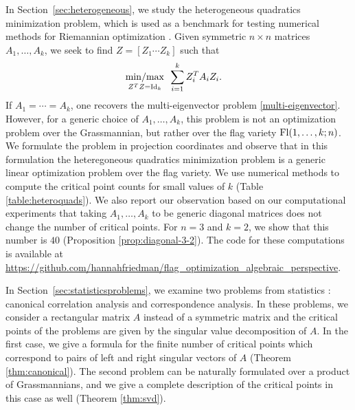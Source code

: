\documentclass[12pt]{extarticle}
\theoremstyle{definition}
\numberwithin{theorem}{section}
\newcommand{\minmax}{\mathop{{\rm min/max}}}
\begin{document}
In Section~\ref{sec:heterogeneous}, we study the heterogeneous quadratics minimization problem, which is used as a benchmark for testing numerical methods for Riemannian optimization \cite{oviedo2022}. 
Given symmetric $n \times n$ matrices $A_1, \ldots, A_k$, we seek to find $Z=[Z_1 \cdots Z_k]$ such that
\begin{align} \label{heteroquads}
    \minmax_{Z^TZ = {\rm Id}_k}
    & \,\,\, \sum_{i=1}^k Z_i^T A_i Z_i.
\end{align}
If $A_1 = \cdots = A_k$, one recovers the multi-eigenvector problem \eqref{multi-eigenvector}. 
However, for a generic choice of $A_1, \ldots, A_k$, this problem is not an optimization problem over the Grassmannian, but rather over the flag variety ${\rm Fl}(1, \ldots, k; n)$. 
We formulate the problem in projection coordinates and observe that in this formulation the heteregoneous  quadratics minimization problem is a generic linear optimization problem over the flag variety. 
We use numerical methods to compute the critical point counts for small values of $k$ (Table \ref{table:heteroquads}). 
We also report our observation based on our computational experiments that taking $A_1, \ldots, A_k$ to be generic diagonal matrices does not change the number of critical points. For $n=3$ and $k=2$, we show that this number is $40$ (Proposition \ref{prop:diagonal-3-2}).
The code for these computations is available at \url{https://github.com/hannahfriedman/flag_optimization_algebraic_perspective}.


In Section~\ref{sec:statisticsproblems}, we examine two problems from statistics \cite{YWL}: canonical correlation analysis and correspondence analysis. 
In these problems, we consider a rectangular matrix $A$ instead of a symmetric matrix and the critical points of the problems are given by the singular value decomposition of $A$. In the first case, we give a formula for the finite number of critical points which correspond to pairs of left and right singular vectors of $A$ (Theorem \ref{thm:canonical}). 
The second problem can be naturally formulated over a product of Grassmannians, and we give a complete description of the critical points in this case as well (Theorem \ref{thm:svd}).
\end{document}
